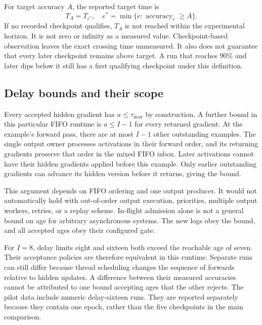 \documentclass[conference]{IEEEtran}
\newcommand{\taumax}{\tau_{\max}}
\begin{document}
For target accuracy $A$, the reported target time is
\begin{equation}
 T_A=T_{e^*},\quad e^*=\min\{e:\operatorname{accuracy}_e\geq A\}.\label{eq:target}
\end{equation}
If no recorded checkpoint qualifies, $T_A$ is not reached within the experimental horizon. It is not zero or infinity as a measured value. Checkpoint-based observation leaves the exact crossing time unmeasured. It also does not guarantee that every later checkpoint remains above target. A run that reaches 90\% and later dips below it still has a first qualifying checkpoint under this definition.

\subsection{Delay bounds and their scope}
Every accepted hidden gradient has $a\leq\taumax$ by construction. A further bound in this particular FIFO runtime is $a\leq I-1$ for every returned gradient. At the example's forward pass, there are at most $I-1$ other outstanding examples. The single output owner processes activations in their forward order, and its returning gradients preserve that order in the mixed FIFO inbox. Later activations cannot have their hidden gradients applied before this example. Only earlier outstanding gradients can advance its hidden version before it returns, giving the bound.

This argument depends on FIFO ordering and one output producer. It would not automatically hold with out-of-order output execution, priorities, multiple output workers, retries, or a replay scheme. In-flight admission alone is not a general bound on age for arbitrary asynchronous systems. The new logs obey the bound, and all accepted ages obey their configured gate.

For $I=8$, delay limits eight and sixteen both exceed the reachable age of seven. Their acceptance policies are therefore equivalent in this runtime. Separate runs can still differ because thread scheduling changes the sequence of forwards relative to hidden updates. A difference between their measured accuracies cannot be attributed to one bound accepting ages that the other rejects. The pilot data include numeric delay-sixteen runs. They are reported separately because they contain one epoch, rather than the five checkpoints in the main comparison.
\end{document}
